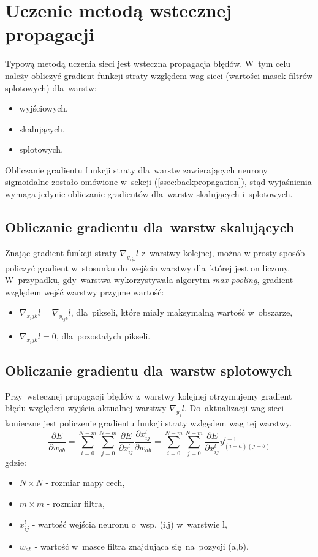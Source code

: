 \section{Uczenie metodą wstecznej propagacji}
Typową metodą uczenia sieci jest wsteczna propagacja błędów. W~tym celu należy obliczyć gradient funkcji
straty względem wag sieci (wartości masek filtrów splotowych) dla~warstw:
\begin{itemize}
  \item wyjściowych,
  \item skalujących,
  \item splotowych.
\end{itemize}
Obliczanie gradientu funkcji straty dla~warstw zawierających neurony sigmoidalne zostało omówione
w~sekcji (\ref{ssec:backpropagation}), stąd wyjaśnienia wymaga jedynie obliczanie gradientów dla~warstw skalujących i~splotowych.

\subsection{Obliczanie gradientu dla~warstw skalujących}
Znając gradient funkcji straty $\nabla_{y_{ijk}}l$ z~warstwy kolejnej, można w prosty sposób policzyć gradient
w~stosunku do~wejścia warstwy dla~której jest on liczony. W~przypadku, gdy~warstwa wykorzystywała algorytm
\textit{max-pooling}, gradient względem wejść warstwy przyjme wartość:
\begin{itemize}
  \item $\nabla_{x_ijk}l = \nabla_{y_{ijk}}l$, dla~pikseli, które miały maksymalną wartość w~obszarze, 
  \item $\nabla_{x_ijk}l = 0$, dla~pozostałych pikseli.
\end{itemize}

\subsection{Obliczanie gradientu dla~warstw splotowych}
Przy~wstecznej propagacji błędów z~warstwy kolejnej otrzymujemy gradient błędu względem wyjścia
aktualnej warstwy $\nabla_{y_j}l$. Do~aktualizacji wag sieci konieczne jest policzenie gradientu funkcji
straty wzlgędem wag tej warstwy.
$$ \frac{\partial E}{\partial w_{ab}} 
= \sum\limits_{i=0}^{N-m}\sum\limits_{j=0}^{N-m}\frac{\partial E}{\partial x_{ij}^l}\frac{\partial
x_{ij}^l}{\partial w_{ab}}
= \sum\limits_{i=0}^{N-m}\sum\limits_{j=0}^{N-m}\frac{\partial E}{\partial x_{ij}^l}y^{l-1}_{(i+a)(j+b)}$$
gdzie:
\begin{itemize}
  \item $N\times N$ - rozmiar mapy cech,
  \item $m\times m$ - rozmiar filtra,
  \item $x_{ij}^l$ - wartość wejścia neuronu o~wsp. (i,j) w~warstwie l,
  \item $w_{ab}$ - wartość w~masce filtra znajdująca się~na~pozycji (a,b).
\end{itemize}

